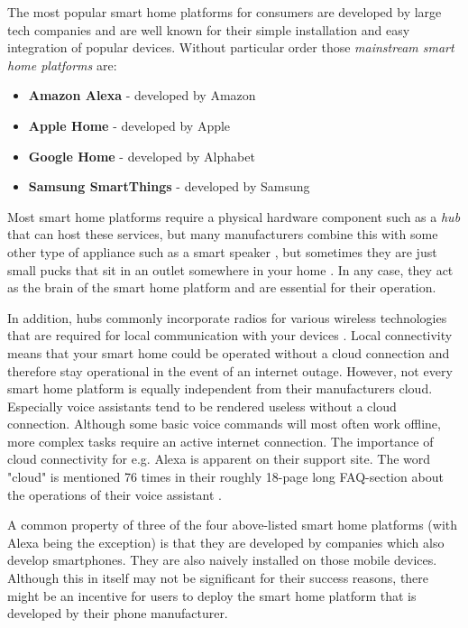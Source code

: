 The most popular smart home platforms for consumers are developed by large tech companies \cite{Tuohy2023SHP} and are well known for their simple installation and easy integration of popular devices. Without particular order those \textit{mainstream smart home platforms} are:
\begin{itemize}
    \item \textbf{Amazon Alexa} - developed by Amazon
    \item \textbf{Apple Home} - developed by Apple
    \item \textbf{Google Home} - developed by Alphabet
    \item \textbf{Samsung SmartThings} - developed by Samsung
\end{itemize}

Most smart home platforms require a physical hardware component such as a \textit{hub} \cite{BertkoChris2017HSH:} that can host these services, but many manufacturers combine this with some other type of appliance such as a smart speaker \cite{Tuohy2023SHP}, but sometimes they are just small pucks that sit in an outlet somewhere in your home \cite{Tuohy2023SHH}. In any case, they act as the brain of the smart home platform and are essential for their operation.

In addition, hubs commonly incorporate radios for various wireless technologies that are required for local communication with your devices \cite{Tuohy2023SHH}. Local connectivity means that your smart home could be operated without a cloud connection and therefore stay operational in the event of an internet outage. However, not every smart home platform is equally independent from their manufacturers cloud. Especially voice assistants tend to be rendered useless without a cloud connection. Although some basic voice commands will most often work offline, more complex tasks require an active internet connection. The importance of cloud connectivity for e.g. Alexa is apparent on their support site. The word "cloud" is mentioned 76 times in their roughly 18-page long FAQ-section about the operations of their voice assistant \cite{AmazonAlexaFAQ}.

A common property of three of the four above-listed smart home platforms (with Alexa being the exception) is that they are developed by companies which also develop smartphones. They are also naively installed on those mobile devices. Although this in itself may not be significant for their success reasons, there might be an incentive for users to deploy the smart home platform that is developed by their phone manufacturer.

